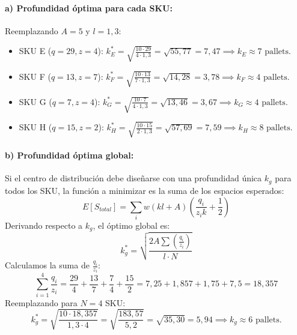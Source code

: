 \documentclass[11pt]{article}
\begin{document}
\paragraph{a) Profundidad óptima para cada SKU:}
Reemplazando $A = 5$ y $l = 1,3$:
\begin{itemize}
    \item SKU E ($q=29, z=4$): $k_E^* = \sqrt{\frac{10 \cdot 29}{4 \cdot 1,3}} = \sqrt{55,77} = 7,47 \implies k_E \approx 7 \text{ pallets}$.
    \item SKU F ($q=13, z=7$): $k_F^* = \sqrt{\frac{10 \cdot 13}{7 \cdot 1,3}} = \sqrt{14,28} = 3,78 \implies k_F \approx 4 \text{ pallets}$.
    \item SKU G ($q=7, z=4$): $k_G^* = \sqrt{\frac{10 \cdot 7}{4 \cdot 1,3}} = \sqrt{13,46} = 3,67 \implies k_G \approx 4 \text{ pallets}$.
    \item SKU H ($q=15, z=2$): $k_H^* = \sqrt{\frac{10 \cdot 15}{2 \cdot 1,3}} = \sqrt{57,69} = 7,59 \implies k_H \approx 8 \text{ pallets}$.
\end{itemize}

\paragraph{b) Profundidad óptima global:}
Si el centro de distribución debe diseñarse con una profundidad única $k_g$ para todos los SKU, la función a minimizar es la suma de los espacios esperados:
$$ E[S_{total}] = \sum_i w \left( k l + A \right) \left( \frac{q_i}{z_i k} + \frac{1}{2} \right) $$
Derivando respecto a $k_g$, el óptimo global es:
$$ k_g^* = \sqrt{ \frac{2 A \sum \left(\frac{q_i}{z_i}\right)}{l \cdot N} } $$
Calculamos la suma de $\frac{q_i}{z_i}$:
$$ \sum_{i=1}^4 \frac{q_i}{z_i} = \frac{29}{4} + \frac{13}{7} + \frac{7}{4} + \frac{15}{2} = 7,25 + 1,857 + 1,75 + 7,5 = 18,357 $$
Reemplazando para $N=4$ SKU:
$$ k_g^* = \sqrt{ \frac{10 \cdot 18,357}{1,3 \cdot 4} } = \sqrt{\frac{183,57}{5,2}} = \sqrt{35,30} = 5,94 \implies k_g \approx 6 \text{ pallets}. $$
\end{document}
